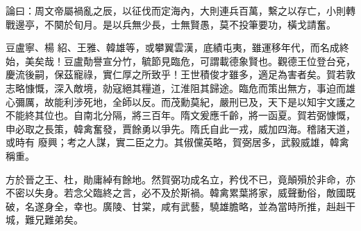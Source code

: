 \begin{pinyinscope}
 論曰：周文帝屬禍亂之辰，以征伐而定海內，大則連兵百萬，繫之以存亡，小則轉戰邊亭，不闋於旬月。是以兵無少長，士無賢愚，莫不投筆要功，橫戈請奮。



 豆盧寧、楊
 紹、王雅、韓雄等，或攀翼雲漢，底績屯夷，雖運移年代，而名成終始，美矣哉！豆盧勣譽宣分竹，毓節見臨危，可謂載德象賢也。觀德王位登台兗，慶流後嗣，保茲寵祿，實仁厚之所致乎！王世積俊才雖多，適足為害者矣。賀若敦志略慷慨，深入敵境，勍寇絕其糧道，江淮阻其歸途。臨危而策出無方，事迫而雄心彌厲，故能利涉死地，全師以反。而茂勳莫紀，嚴刑已及，天下是以知宇文護之不能終其位也。自南北分隔，將三百年。隋文爰應千齡，將一函夏。賀若弼慷慨，申必取之長策，韓禽奮發，賈餘勇以爭先。隋氏自此一戎，威加四海。稽諸天道，或時有
 廢興；考之人謀，實二臣之力。其俶儻英略，賀弼居多，武毅威雄，韓禽稱重。



 方於晉之王、杜，勛庸綽有餘地。然賀弼功成名立，矜伐不已，竟顛殞於非命，亦不密以失身。若念父臨終之言，必不及於斯禍。韓禽累葉將家，威聲動俗，敵國既破，名遂身全，幸也。廣陵、甘棠，咸有武藝，驍雄膽略，並為當時所推，赳赳干城，難兄難弟矣。



\end{pinyinscope}